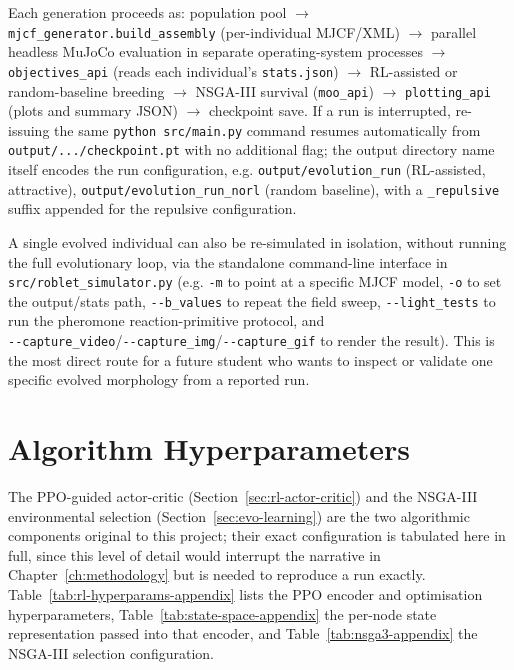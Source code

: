 \documentclass[12pt,a4paper]{report}
\begin{document}
Each generation proceeds as: population pool $\rightarrow$ \texttt{mjcf\_generator.build\_assembly} (per-individual MJCF/XML) $\rightarrow$ parallel headless MuJoCo evaluation in separate operating-system processes $\rightarrow$ \texttt{objectives\_api} (reads each individual's \texttt{stats.json}) $\rightarrow$ RL-assisted or random-baseline breeding $\rightarrow$ NSGA-III survival (\texttt{moo\_api}) $\rightarrow$ \texttt{plotting\_api} (plots and summary JSON) $\rightarrow$ checkpoint save. 
If a run is interrupted, re-issuing the same \texttt{python src/main.py} command resumes automatically from \\ \texttt{output/.../checkpoint.pt} with no additional flag; the output directory name itself encodes the run configuration, e.g. \texttt{output/evolution\_run} (RL-assisted, attractive), \texttt{output/evolution\_run\_norl} (random baseline), with a \texttt{\_repulsive} suffix appended for the repulsive configuration.

A single evolved individual can also be re-simulated in isolation, without running the full evolutionary loop, via the standalone command-line interface in \\ \texttt{src/roblet\_simulator.py} (e.g. \texttt{-m} to point at a specific MJCF model, \texttt{-o} to set the output/stats path, \texttt{-{}-b\_values} to repeat the field sweep, \texttt{-{}-light\_tests} to run the pheromone reaction-primitive protocol, and \\ \texttt{-{}-capture\_video}/\texttt{-{}-capture\_img}/\texttt{-{}-capture\_gif} to render the result). This is the most direct route for a future student who wants to inspect or validate one specific evolved morphology from a reported run.

\section{Algorithm Hyperparameters}
\label{app:algo}
The PPO-guided actor-critic (Section~\ref{sec:rl-actor-critic}) and the NSGA-III environmental selection (Section~\ref{sec:evo-learning}) are the two algorithmic components original to this project; their exact configuration is tabulated here in full, since this level of detail would interrupt the narrative in Chapter~\ref{ch:methodology} but is needed to reproduce a run exactly. Table~\ref{tab:rl-hyperparams-appendix} lists the PPO encoder and optimisation hyperparameters, Table~\ref{tab:state-space-appendix} the per-node state representation passed into that encoder, and Table~\ref{tab:nsga3-appendix} the NSGA-III selection configuration.
\end{document}
